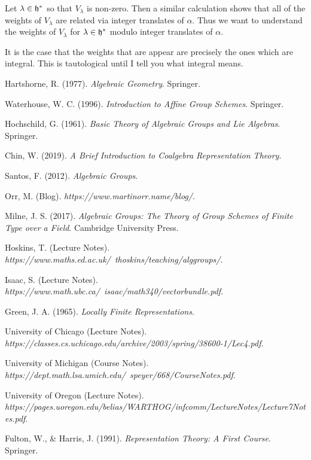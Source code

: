 \documentclass[12pt]{article}
\begin{document}
Let $\lambda\in\mathfrak{h}^*$ so that $V_\lambda$ is non-zero. Then a similar calculation shows that
all of the weights of $V_\lambda$ are related via integer translates of $\alpha$. Thus we want to 
understand the weights of $V_\lambda$ for $\lambda\in \mathfrak{h}^*$ modulo integer translates of $\alpha$.

It is the case that the weights that are appear are precisely the ones which are integral. This is
tautological until I tell you what integral means. 


\newpage

\begin{thebibliography}{99}

Hartshorne, R. (1977). \textit{Algebraic Geometry}. Springer.

Waterhouse, W. C. (1996). \textit{Introduction to Affine Group Schemes}. Springer.

Hochschild, G. (1961). \textit{Basic Theory of Algebraic Groups and Lie Algebras}. Springer.

Chin, W. (2019). \textit{A Brief Introduction to Coalgebra Representation Theory}.

Santos, F. (2012). \textit{Algebraic Groups}.

Orr, M. (Blog). \textit{https://www.martinorr.name/blog/}.

Milne, J. S. (2017). \textit{Algebraic Groups: The Theory of Group Schemes of Finite Type over a Field}. Cambridge University Press.

Hoskins, T. (Lecture Notes). \textit{https://www.maths.ed.ac.uk/~thoskins/teaching/alggroups/}.

Isaac, S. (Lecture Notes). \textit{https://www.math.ubc.ca/~isaac/math340/vectorbundle.pdf}.

Green, J. A. (1965). \textit{Locally Finite Representations}.

University of Chicago (Lecture Notes). \textit{https://classes.cs.uchicago.edu/archive/2003/spring/38600-1/Lec4.pdf}.

University of Michigan (Course Notes). \textit{https://dept.math.lsa.umich.edu/~speyer/668/CourseNotes.pdf}.

University of Oregon (Lecture Notes). \textit{https://pages.uoregon.edu/belias/WARTHOG/infcomm/LectureNotes/Lecture7Notes.pdf}.


Fulton, W., \& Harris, J. (1991). \textit{Representation Theory: A First Course}. Springer.


\end{thebibliography}
\end{document}
